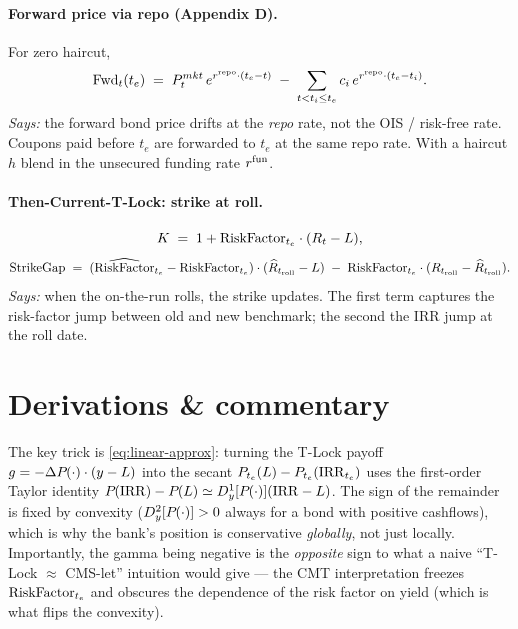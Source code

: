 \documentclass[11pt,a4paper]{article}
\begin{document}
\paragraph{Forward price via repo (Appendix D).}
For zero haircut,
\begin{equation}\label{eq:fwd-repo}
  \mathrm{Fwd}_{t}(t_e) \;=\; P_t^{mkt} \, e^{r^{\mathrm{repo}} \cdot (t_e - t)}
                  \;-\; \sum_{t < t_i \le t_e} c_i \, e^{r^{\mathrm{repo}} \cdot (t_e - t_i)}.
\end{equation}
\textit{Says:} the forward bond price drifts at the \emph{repo} rate,
not the OIS / risk-free rate. Coupons paid before $t_e$ are forwarded
to $t_e$ at the same repo rate. With a haircut $h$ blend in the
unsecured funding rate $r^{\mathrm{fun}}$.

\paragraph{Then-Current-T-Lock: strike at roll.}
\begin{equation}\label{eq:tcurr-strike}
  K \;=\; 1 + \mathrm{RiskFactor}_{t_e} \cdot (R_t - L),
\end{equation}
\begin{equation}\label{eq:tcurr-strikegap}
  \mathrm{StrikeGap}
   \;=\; (\widehat{\mathrm{RiskFactor}}_{t_e} - \mathrm{RiskFactor}_{t_e})\cdot(\widehat{R}_{t_{\mathrm{roll}}} - L)
   \;-\; \mathrm{RiskFactor}_{t_e}\cdot(R_{t_{\mathrm{roll}}} - \widehat{R}_{t_{\mathrm{roll}}}).
\end{equation}
\textit{Says:} when the on-the-run rolls, the strike updates. The
first term captures the risk-factor jump between old and new
benchmark; the second the IRR jump at the roll date.

\section{Derivations \& commentary}

\begin{commentary}
The key trick is \eqref{eq:linear-approx}: turning the T-Lock payoff
$g = -\Delta P_{}(\cdot) \cdot (y - L)$ into the secant
$P_{t_e}(L) - P_{t_e}(\mathrm{IRR}_{t_e})$ uses the first-order
Taylor identity $P_{}(\mathrm{IRR}) - P_{}(L) \simeq D_{y}^{1}[P_{}(\cdot)](\mathrm{IRR} - L)$.
The sign of the remainder is fixed by convexity ($D_{y}^{2}[P_{}(\cdot)] > 0$
always for a bond with positive cashflows), which is why the bank's
position is conservative \emph{globally}, not just locally. Importantly,
the gamma being negative is the \emph{opposite} sign to what a naive
``T-Lock $\approx$ CMS-let'' intuition would give --- the CMT
interpretation freezes $\mathrm{RiskFactor}_{t_e}$ and obscures the dependence of
the risk factor on yield (which is what flips the convexity).
\end{commentary}
\end{document}
